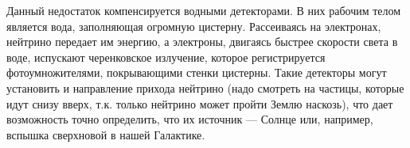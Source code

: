 Данный недостаток компенсируется водными детекторами. В них рабочим телом является вода, заполняющая огромную цистерну. Рассеиваясь на электронах, нейтрино передает им энергию, а электроны, двигаясь быстрее скорости света в воде, испускают черенковское излучение, которое регистрируется фотоумножителями, покрывающими стенки цистерны. Такие детекторы могут установить и направление прихода нейтрино (надо смотреть на частицы, которые идут снизу вверх, т.к. только нейтрино может пройти Землю наскозь), что дает возможность точно определить, что их источник --- Солнце или, например, вспышка сверхновой в нашей Галактике.

